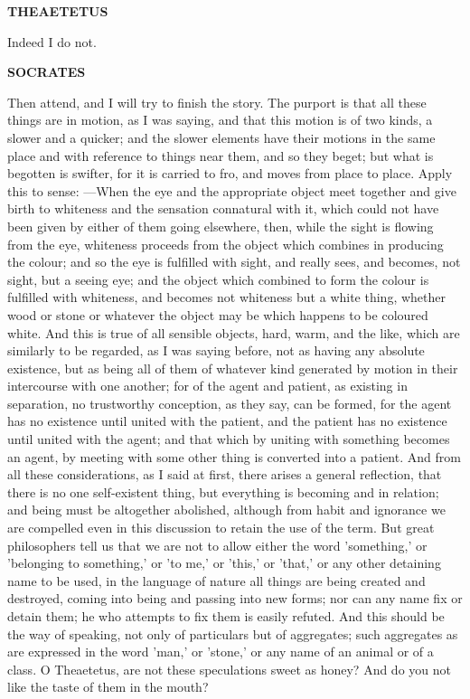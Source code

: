 \documentclass[11pt,letter]{article}
\begin{document}
\par \textbf{THEAETETUS}
\par   Indeed I do not.

\par \textbf{SOCRATES}
\par   Then attend, and I will try to finish the story. The purport is that all these things are in motion, as I was saying, and that this motion is of two kinds, a slower and a quicker; and the slower elements have their motions in the same place and with reference to things near them, and so they beget; but what is begotten is swifter, for it is carried to fro, and moves from place to place. Apply this to sense: —When the eye and the appropriate object meet together and give birth to whiteness and the sensation connatural with it, which could not have been given by either of them going elsewhere, then, while the sight is flowing from the eye, whiteness proceeds from the object which combines in producing the colour; and so the eye is fulfilled with sight, and really sees, and becomes, not sight, but a seeing eye; and the object which combined to form the colour is fulfilled with whiteness, and becomes not whiteness but a white thing, whether wood or stone or whatever the object may be which happens to be coloured white. And this is true of all sensible objects, hard, warm, and the like, which are similarly to be regarded, as I was saying before, not as having any absolute existence, but as being all of them of whatever kind generated by motion in their intercourse with one another; for of the agent and patient, as existing in separation, no trustworthy conception, as they say, can be formed, for the agent has no existence until united with the patient, and the patient has no existence until united with the agent; and that which by uniting with something becomes an agent, by meeting with some other thing is converted into a patient. And from all these considerations, as I said at first, there arises a general reflection, that there is no one self-existent thing, but everything is becoming and in relation; and being must be altogether abolished, although from habit and ignorance we are compelled even in this discussion to retain the use of the term. But great philosophers tell us that we are not to allow either the word 'something,' or 'belonging to something,' or 'to me,' or 'this,' or 'that,' or any other detaining name to be used, in the language of nature all things are being created and destroyed, coming into being and passing into new forms; nor can any name fix or detain them; he who attempts to fix them is easily refuted. And this should be the way of speaking, not only of particulars but of aggregates; such aggregates as are expressed in the word 'man,' or 'stone,' or any name of an animal or of a class. O Theaetetus, are not these speculations sweet as honey? And do you not like the taste of them in the mouth?
\end{document}
